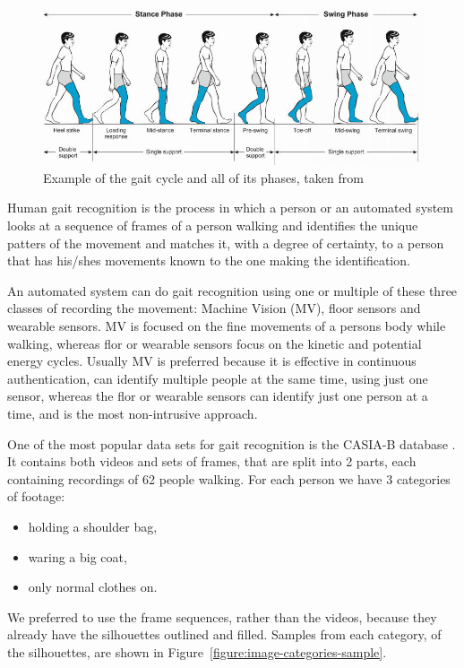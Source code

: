 \documentclass[12pt]{article}
\theoremstyle{definition}
\begin{document}
	\begin{figure}[h]
		\centering

		\includegraphics[width=\textwidth]{phases-of-gait-cycle.png}

		\caption{Example of the gait cycle and all of its phases, taken from \cite{gait-cycle-image}}
		\label{figure:gait-cycle-image}
	\end{figure}

	Human gait recognition is the process in which a person or an automated system looks at a sequence of frames of a person walking and identifies the unique patters of the movement and matches it, with a degree of certainty, to a person that has his/shes movements known to the one making the identification.

	An automated system can do gait recognition using one or multiple of these three classes of recording the movement: Machine Vision (MV), floor sensors and wearable sensors. MV is focused on the fine movements of a persons body while walking, whereas flor or wearable sensors focus on the kinetic and potential energy cycles. Usually MV is preferred because it is effective in continuous authentication, can identify multiple people at the same time, using just one sensor, whereas the flor or wearable sensors can identify just one person at a time, and is the most non-intrusive approach.

	One of the most popular data sets for gait recognition is the CASIA-B database \cite{casia1}\cite{casia2}\cite{casia3}. It contains both videos and sets of frames, that are split into 2 parts, each containing recordings of 62 people walking. For each person we have 3 categories of footage:
	\begin{itemize}
		\item holding a shoulder bag,
		\item waring a big coat,
		\item only normal clothes on.
	\end{itemize} We preferred to use the frame sequences, rather than the videos, because they already have the silhouettes outlined and filled. Samples from each category, of the silhouettes, are shown in Figure~\ref{figure:image-categories-sample}.
\end{document}
